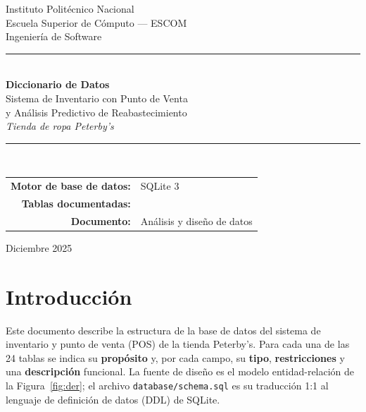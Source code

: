 \documentclass[11pt]{article}
\begin{document}
\begin{titlepage}
\centering
\vspace*{1.2cm}
{\sffamily\large Instituto Politécnico Nacional}\\[0.2cm]
{\sffamily Escuela Superior de Cómputo --- ESCOM}\\[0.2cm]
{\sffamily Ingeniería de Software}\\[2.2cm]

{\color{rule}\rule{\linewidth}{0.8pt}}\\[0.6cm]
{\Huge\sffamily\bfseries\color{brand} Diccionario de Datos}\\[0.5cm]
{\large\sffamily Sistema de Inventario con Punto de Venta\\ y Análisis Predictivo de Reabastecimiento}\\[0.3cm]
{\large\sffamily\itshape Tienda de ropa Peterby's}\\[0.4cm]
{\color{rule}\rule{\linewidth}{0.8pt}}\\[1.6cm]

\begin{tabular}{rl}
\sffamily\bfseries Motor de base de datos: & \sffamily SQLite 3 \\[0.2cm]
\sffamily\bfseries Tablas documentadas: & \sffamily 24 \\[0.2cm]
\sffamily\bfseries Documento: & \sffamily Análisis y diseño de datos \\
\end{tabular}

\vfill
{\sffamily\small Diciembre 2025}
\end{titlepage}

\tableofcontents
\clearpage

\section{Introducción}

Este documento describe la estructura de la base de datos del sistema de
inventario y punto de venta (POS) de la tienda Peterby's. Para cada una de las
24 tablas se indica su \textbf{propósito} y, por cada campo, su \textbf{tipo},
\textbf{restricciones} y una \textbf{descripción} funcional. La fuente de diseño
es el modelo entidad-relación de la Figura~\ref{fig:der}; el archivo
\texttt{database/schema.sql} es su traducción 1:1 al lenguaje de definición de
datos (DDL) de SQLite.
\end{document}
